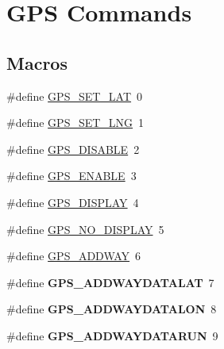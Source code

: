 \hypertarget{group__gps__commands}{\section{G\-P\-S Commands}
\label{group__gps__commands}
}
\subsection*{Macros}
\begin{DoxyCompactItemize}
\item 
\#define \hyperlink{group__gps__commands_gaac31d4fc4681381604fdbf78b5aa7599}{G\-P\-S\-\_\-\-S\-E\-T\-\_\-\-L\-A\-T}~0
\item 
\#define \hyperlink{group__gps__commands_gafe7ed49e1848a16fd15d1643b4c4c36b}{G\-P\-S\-\_\-\-S\-E\-T\-\_\-\-L\-N\-G}~1
\item 
\#define \hyperlink{group__gps__commands_ga8e394314aacedb0790203d4af6cd5710}{G\-P\-S\-\_\-\-D\-I\-S\-A\-B\-L\-E}~2
\item 
\#define \hyperlink{group__gps__commands_gac8383d8fc4fa97bb45f89d9a50e0966d}{G\-P\-S\-\_\-\-E\-N\-A\-B\-L\-E}~3
\item 
\#define \hyperlink{group__gps__commands_gad25ca4dcc3aa69da0e474e3b69cc910a}{G\-P\-S\-\_\-\-D\-I\-S\-P\-L\-A\-Y}~4
\item 
\#define \hyperlink{group__gps__commands_ga3de45ac0f8b80c8044b533d47cf08e99}{G\-P\-S\-\_\-\-N\-O\-\_\-\-D\-I\-S\-P\-L\-A\-Y}~5
\item 
\#define \hyperlink{group__gps__commands_ga8fea9a175c11935b9e7cc3e2857621aa}{G\-P\-S\-\_\-\-A\-D\-D\-W\-A\-Y}~6
\item 
\hypertarget{group__gps__commands_gae6a303b17a88ef3e34cf8e3caf8f7a52}{\#define {\bfseries G\-P\-S\-\_\-\-A\-D\-D\-W\-A\-Y\-D\-A\-T\-A\-L\-A\-T}~7}\label{group__gps__commands_gae6a303b17a88ef3e34cf8e3caf8f7a52}

\item 
\hypertarget{group__gps__commands_ga0d500f7c6ef80090a0c8928e4d7e0f59}{\#define {\bfseries G\-P\-S\-\_\-\-A\-D\-D\-W\-A\-Y\-D\-A\-T\-A\-L\-O\-N}~8}\label{group__gps__commands_ga0d500f7c6ef80090a0c8928e4d7e0f59}

\item 
\hypertarget{group__gps__commands_ga9a0958ce7693698b1bb24e54413819ed}{\#define {\bfseries G\-P\-S\-\_\-\-A\-D\-D\-W\-A\-Y\-D\-A\-T\-A\-R\-U\-N}~9}\label{group__gps__commands_ga9a0958ce7693698b1bb24e54413819ed}

\end{DoxyCompactItemize}


